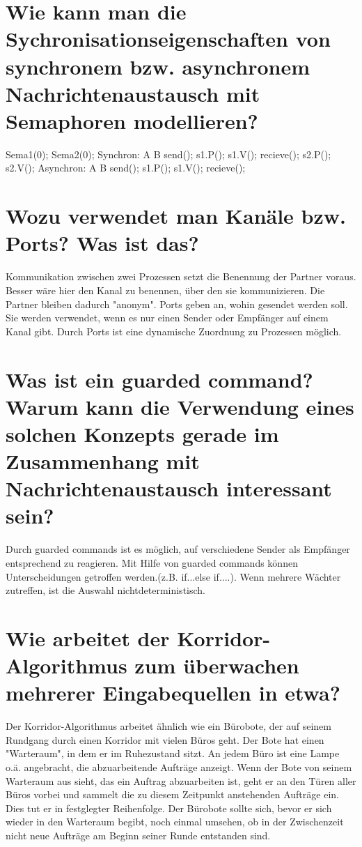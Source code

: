 \documentclass[12pt,a4paper,ngerman]{scrartcl}
\newcommand{\question}[1]{#1}
\newenvironment {answer}
                {}
                {}
\begin{document}
\section{\question{Wie kann man die Sychronisationseigenschaften von synchronem bzw. asynchronem Nachrichtenaustausch mit Semaphoren modellieren?}}
\begin{answer}
Sema1(0);
Sema2(0);
Synchron:
A B
send(); s1.P();
s1.V(); recieve();
s2.P(); s2.V();
Asynchron:
A B
send(); s1.P();
s1.V(); recieve();
\end{answer}

\section{\question{Wozu verwendet man Kanäle bzw. Ports? Was ist das?}}
\begin{answer}
Kommunikation zwischen zwei Prozessen setzt die Benennung der Partner voraus. Besser wäre hier den Kanal zu benennen, über den sie kommunizieren. Die Partner bleiben dadurch "anonym".
Ports geben an, wohin gesendet werden soll. Sie werden verwendet, wenn es nur einen Sender
oder Empfänger auf einem Kanal gibt. Durch Ports ist eine dynamische Zuordnung zu Prozessen
möglich.
\end{answer}

\section{\question{Was ist ein guarded command? Warum kann die Verwendung eines solchen Konzepts gerade im
Zusammenhang mit Nachrichtenaustausch interessant sein?}}
\begin{answer}
Durch guarded commands ist es möglich, auf verschiedene Sender als Empfänger entsprechend
zu reagieren. Mit Hilfe von guarded commands können Unterscheidungen getroffen werden.(z.B.
if...else if....).
Wenn mehrere Wächter zutreffen, ist die Auswahl nichtdeterministisch.
\end{answer}

\section{\question{Wie arbeitet der Korridor-Algorithmus zum überwachen mehrerer Eingabequellen in etwa?}}
\begin{answer}
Der Korridor-Algorithmus arbeitet ähnlich wie ein Bürobote, der auf seinem Rundgang durch einen
Korridor mit vielen Büros geht. Der Bote hat einen "Warteraum", in dem er im Ruhezustand sitzt.
An jedem Büro ist eine Lampe o.ä. angebracht, die abzuarbeitende Aufträge anzeigt.
Wenn der Bote von seinem Warteraum aus sieht, das ein Auftrag abzuarbeiten ist, geht er an den
Türen aller Büros vorbei und sammelt die zu diesem Zeitpunkt anstehenden Aufträge ein. Dies
tut er in festglegter Reihenfolge. Der Bürobote sollte sich, bevor er sich wieder in den Warteraum
begibt, noch einmal umsehen, ob in der Zwischenzeit nicht neue Aufträge am Beginn seiner Runde
entstanden sind.
\end{answer}
\end{document}
